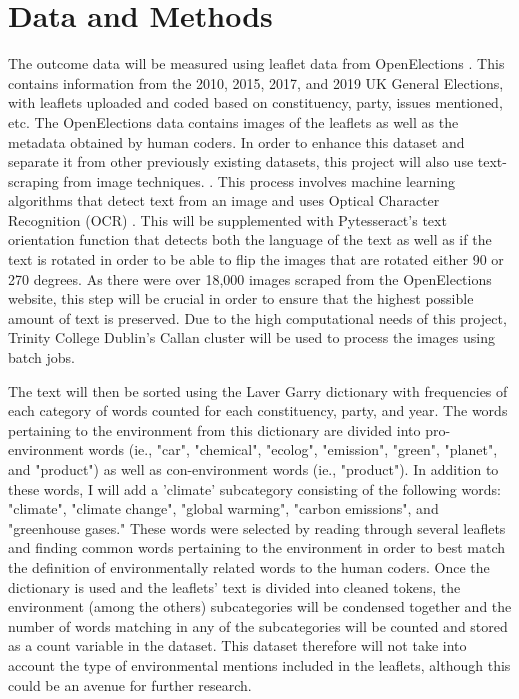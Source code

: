 \documentclass[12pt,letterpaper]{article}
\begin{document}
	
	\section{Data and Methods}

The outcome data will be measured using leaflet data from OpenElections \autocite{milazzo2020openelections}. This contains information from the 2010, 2015, 2017, and 2019 UK General Elections, with leaflets uploaded and coded based on constituency, party, issues mentioned, etc. The OpenElections data contains images of the leaflets as well as the metadata obtained by human coders. In order to enhance this dataset and separate it from other previously existing datasets, this project will also use text-scraping from image techniques. \autocite{KerasocrKeras_ocrDocumentation,hoffstaetterPytesseractPythontesseractPython}. This process involves machine learning algorithms that detect text from an image and uses Optical Character Recognition (OCR) \autocite{madhugiriExtractTextImages2022}. This will be supplemented with Pytesseract's text orientation function that detects both the language of the text as well as if the text is rotated \autocite{rosebrockCorrectingTextOrientation2022} in order to be able to flip the images that are rotated either 90 or 270 degrees. As there were over 18,000 images scraped from the OpenElections website, this step will be crucial in order to ensure that the highest possible amount of text is preserved. Due to the high computational needs of this project, Trinity College Dublin's Callan cluster will be used to process the images using batch jobs.



The text will then be sorted using the Laver Garry dictionary \autocite{laverEstimatingPolicyPositions2000} with frequencies of each category of words counted for each constituency, party, and year. The words pertaining to the environment from this dictionary are divided into pro-environment words (ie., "car", "chemical", "ecolog", "emission", "green", "planet", and "product") as well as con-environment words (ie., "product"). In addition to these words, I will add a 'climate' subcategory consisting of the following words: "climate", "climate change", "global warming", "carbon emissions", and "greenhouse gases." These words were selected by reading through several leaflets and finding common words pertaining to the environment in order to best match the definition of environmentally related words to the human coders. Once the dictionary is used and the leaflets' text is divided into cleaned tokens, the environment (among the others) subcategories will be condensed together and the number of words matching in any of the subcategories will be counted and stored as a count variable in the dataset. This dataset therefore will not take into account the type of environmental mentions included in the leaflets, although this could be an avenue for further research. 
\end{document}
